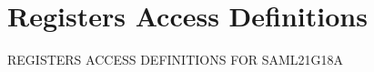 \hypertarget{group___s_a_m_l21_g18_a__reg}{}\section{Registers Access Definitions}
\label{group___s_a_m_l21_g18_a__reg}
R\+E\+G\+I\+S\+T\+E\+R\+S A\+C\+C\+E\+S\+S D\+E\+F\+I\+N\+I\+T\+I\+O\+N\+S F\+O\+R S\+A\+M\+L21\+G18\+A 